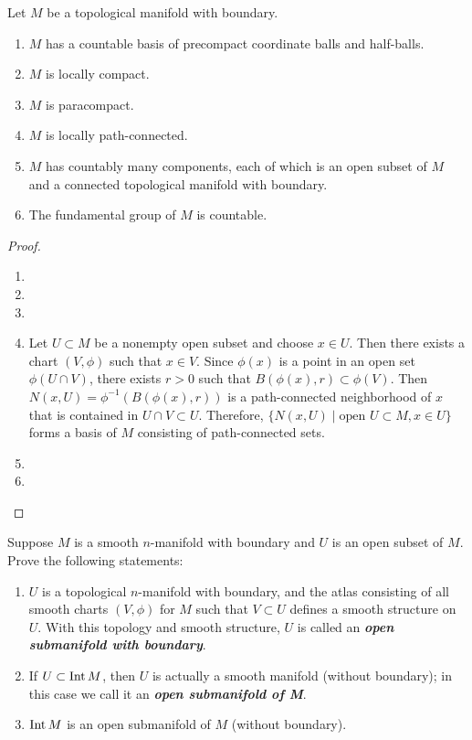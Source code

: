 \begin{customexer}{1.41}\label{exercise_1_41}
  Let $M$ be a topological manifold with boundary.
  \begin{enumerate}[label=(\alph*)]
    \item
      $M$ has a countable basis of precompact coordinate balls and half-balls.
    \item
      $M$ is locally compact.
    \item
      $M$ is paracompact.
    \item
      $M$ is locally path-connected.
    \item
      $M$ has countably many components, each of which is an open subset of $M$ and a connected topological manifold with boundary.
    \item
      The fundamental group of $M$ is countable.
  \end{enumerate}
\end{customexer}

\begin{proof}
  $ $
  \begin{enumerate}[label=(\alph*)]
    \item
    \item
    \item
    \item
      Let $U \subset M$ be a nonempty open subset and choose $x \in U$.
      Then there exists a chart $(V, \phi)$ such that $x \in V$.
      Since $\phi(x)$ is a point in an open set $\phi(U \cap V)$, there exists $r > 0$ such that $B(\phi(x), r) \subset \phi(V)$.
      Then $N(x, U) = \phi^{-1}(B(\phi(x), r))$ is a path-connected neighborhood of $x$ that is contained in $U \cap V \subset U$.
      Therefore, $\{ N(x, U) \mid \text{open } U \subset M, x \in U \}$ forms a basis of $M$ consisting of path-connected sets.
    \item
    \item
  \end{enumerate}
\end{proof}

\begin{customexer}{1.44}\label{exercise_1_44}
  Suppose $M$ is a smooth $n$-manifold with boundary and $U$ is an open subset of $M$.
  Prove the following statements:
  \begin{enumerate}[label=(\alph*)]
    \item
      $U$ is a topological $n$-manifold with boundary, and the atlas consisting of all smooth charts $(V, \phi)$ for $M$ such that $V \subset U$ defines a smooth structure on $U$.
      With this topology and smooth structure, $U$ is called an \textit{\textbf{open submanifold with boundary}}.
    \item
      If $U \subset \operatorname{Int} M$, then $U$ is actually a smooth manifold (without boundary); in this case we call it an \textit{\textbf{open submanifold of M}}.
    \item
      $\operatorname{Int} M$ is an open submanifold of $M$ (without boundary).
  \end{enumerate}
\end{customexer}

